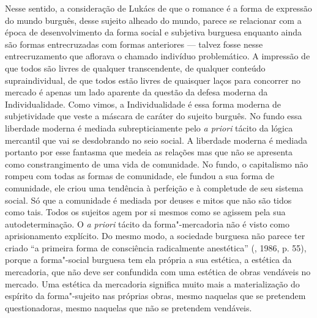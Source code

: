 Nesse sentido, a consideração de Lukács de que o romance é a forma de
expressão do mundo burguês, desse sujeito alheado do mundo, parece se
relacionar com a época de desenvolvimento da forma social e subjetiva
burguesa enquanto ainda são formas entrecruzadas com formas anteriores
--- talvez fosse nesse entrecruzamento que aflorava o chamado indivíduo
problemático. A impressão de que todos são livres de qualquer
transcendente, de qualquer conteúdo supraindividual, de que todos estão
livres de quaisquer laços para concorrer no mercado é apenas um lado
aparente da questão da defesa moderna da Individualidade. Como vimos, a
Individualidade é essa forma moderna de subjetividade que veste a
máscara de caráter do sujeito burguês. No fundo essa liberdade moderna é
mediada subrepticiamente pelo \emph{a priori} tácito da lógica mercantil
que vai se desdobrando no seio social. A liberdade moderna é mediada
portanto por esse fantasma que medeia as relações mas que não se
apresenta como constrangimento de uma vida de comunidade. No fundo, o
capitalismo não rompeu com todas as formas de comunidade, ele fundou a
sua forma de comunidade, ele criou uma tendência à perfeição e à
completude de seu sistema social. Só que a comunidade é mediada por
deuses e mitos que não são tidos como tais. Todos os sujeitos agem por
si mesmos como se agissem pela sua autodeterminação. O \emph{a priori}
tácito da forma"-mercadoria não é visto como aprisionamento explícito. Do
mesmo modo, a sociedade burguesa não parece ter criado ``a primeira
forma de consciência radicalmente anestética'' (, 1986, p. 55),
porque a forma"-social burguesa tem ela própria a sua estética, a
estética da mercadoria, que não deve ser confundida com uma estética de
obras vendáveis no mercado. Uma estética da mercadoria significa muito
mais a materialização do espírito da forma"-sujeito nas próprias obras,
mesmo naquelas que se pretendem questionadoras, mesmo naquelas que não
se pretendem vendáveis.

